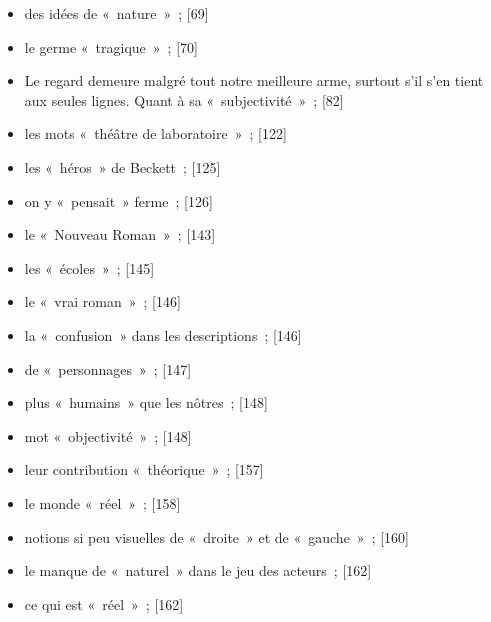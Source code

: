 \documentclass[12pt, a4paper]{article}
\begin{document}
\begin{itemize}
    \item des idées de «~nature~»{\color{gray}~; [69]}

    \item le germe «~tragique~»{\color{gray}~; [70]}

    \item Le regard demeure malgré tout notre meilleure arme, surtout s’il s’en tient aux seules
                  lignes. Quant à sa «~subjectivité~»{\color{gray}~; [82]}

    \item les mots «~théâtre de laboratoire~»{\color{gray}~; [122]}

    \item les «~héros~» de Beckett{\color{gray}~; [125]}

    \item on y «~pensait~» ferme{\color{gray}~; [126]}

    \item le «~Nouveau Roman~»{\color{gray}~; [143]}

    \item les «~écoles~»{\color{gray}~; [145]}

    \item le «~vrai roman~»{\color{gray}~; [146]}

    \item la «~confusion~» dans les descriptions{\color{gray}~; [146]}

    \item de «~personnages~»{\color{gray}~; [147]}

    \item plus «~humains~» que les nôtres{\color{gray}~; [148]}

    \item mot «~objectivité~»{\color{gray}~; [148]}

    \item leur contribution «~théorique~»{\color{gray}~; [157]}

    \item le monde «~réel~»{\color{gray}~; [158]}

    \item notions si peu visuelles de «~droite~» et de «~gauche~»{\color{gray}~; [160]}

    \item le manque de «~naturel~» dans le jeu des acteurs{\color{gray}~; [162]}

    \item ce qui est «~réel~»{\color{gray}~; [162]}


\end{itemize}
\end{document}
